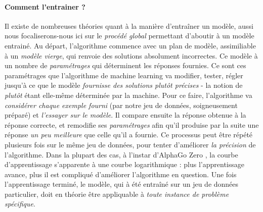 \paragraph{Comment l'entrainer ?} Il existe de nombreuses théories quant à la manière d'entraîner un modèle, aussi nous focaliserons-nous ici sur le \emph{procédé global}
permettant d'aboutir à un modèle entrainé. Au départ, l'algorithme commence avec un plan de modèle, assimiliable à un \emph{modèle vierge}, qui renvoie des solutions 
absolument incorrectes. Ce modèle à un nombre de \emph{paramétrages} qui déterminent les réponses fournies. Ce sont ces paramétrages que l'algorithme de machine learning va
modifier, tester, régler jusqu'à ce que le modèle \emph{fournisse des solutions plutôt précises} - la notion de \emph{plutôt} étant elle-même déterminée par la machine.
Pour ce faire, l'algorithme va \emph{considérer chaque exemple fourni} (par notre jeu de données, soigneusement préparé) et \emph{l'essayer sur le modèle}. Il compare ensuite
la réponse obtenue à la réponse correcte, et remodifie ses \emph{paramétrages} afin qu'il produise par la suite une réponse \emph{un peu meilleure} que celle qu'il a fournie.
Ce processus peut être répété plusieurs fois sur le même jeu de données, pour tenter d'améliorer \emph{la précision} de l'algorithme. Dans la plupart des cas, à l'instar d'AlphaGo
Zero \cite{AlphaGo2}, la courbe d'apprentissage s'apparente à une courbe logarithmique : plus l'apprentissage avance, plus il est compliqué d'améliorer l'algorithme en question.
Une fois l'apprentissage terminé, le modèle, qui à été entraîné sur un jeu de données particulier, doit en théorie être appliquable à \emph{toute instance de problème spécifique}.

